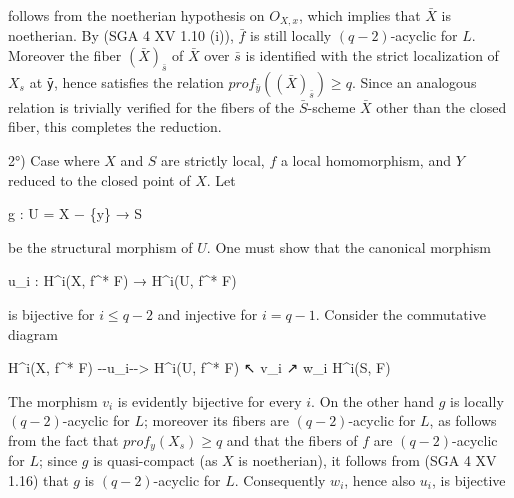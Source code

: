\documentclass[
]{article}
\newenvironment{Shaded}{}{}
\newcommand{\NormalTok}[1]{#1}
\begin{document}
follows from the noetherian hypothesis on \(O_{X,x}\), which implies
that \(\bar{X}\) is noetherian. By (SGA 4 XV 1.10 (i)), \(\bar{f}\) is
still locally \((q - 2)\)-acyclic for \(L\). Moreover the fiber
\((\bar{X})_{\bar{s}}\) of \(\bar{X}\) over \(\bar{s}\) is identified
with the strict localization of \(X_{s}\) at \texttt{ȳ}, hence satisfies
the relation \(prof_{\bar{y}}((\bar{X})_{\bar{s}}) \geqslant q\). Since
an analogous relation is trivially verified for the fibers of the
\(\bar{S}\)-scheme \(\bar{X}\) other than the closed fiber, this
completes the reduction.

2°) Case where \(X\) and \(S\) are strictly local, \(f\) a local
homomorphism, and \(Y\) reduced to the closed point of \(X\). Let

\begin{Shaded}
\begin{Highlighting}[]
\NormalTok{g : U = X − \{y\} → S}
\end{Highlighting}
\end{Shaded}

be the structural morphism of \(U\). One must show that the canonical
morphism

\begin{Shaded}
\begin{Highlighting}[]
\NormalTok{u\_i : H\^{}i(X, f\^{}* F) → H\^{}i(U, f\^{}* F)}
\end{Highlighting}
\end{Shaded}

is bijective for \(i \leqslant q - 2\) and injective for \(i = q - 1\).
Consider the commutative diagram

\begin{Shaded}
\begin{Highlighting}[]
\NormalTok{H\^{}i(X, f\^{}* F) {-}{-}u\_i{-}{-}\textgreater{} H\^{}i(U, f\^{}* F)}
\NormalTok{       ↖ v\_i           ↗ w\_i}
\NormalTok{          H\^{}i(S, F)}
\end{Highlighting}
\end{Shaded}

The morphism \(v_{i}\) is evidently bijective for every \(i\). On the
other hand \(g\) is locally \((q - 2)\)-acyclic for \(L\); moreover its
fibers are \((q - 2)\)-acyclic for \(L\), as follows from the fact that
\(prof_{y}(X_{s}) \geqslant q\) and that the fibers of \(f\) are
\((q - 2)\)-acyclic for \(L\); since \(g\) is quasi-compact (as \(X\) is
noetherian), it follows from (SGA 4 XV 1.16) that \(g\) is
\((q - 2)\)-acyclic for \(L\). Consequently \(w_{i}\), hence also
\(u_{i}\), is bijective
\end{document}
